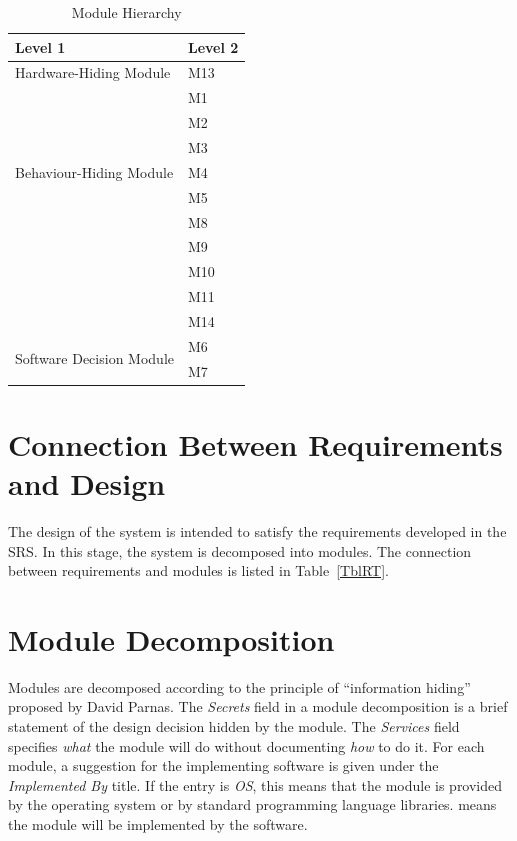 \documentclass[12pt, titlepage]{article}
\begin{document}
\begin{table}[H]
\centering
\begin{tabular}{p{} p{}}
\toprule
\textbf{Level 1} & \textbf{Level 2}\\
\midrule

{Hardware-Hiding Module} & M13 \\
\midrule

\multirow{7}{0.3\textwidth}{Behaviour-Hiding Module}
& M1\\
& M2\\
& M3\\
& M4\\
& M5\\
& M8\\
& M9\\
& M10\\
& M11\\
& M14\\
\midrule

\multirow{2}{0.3\textwidth}{Software Decision Module} & M6 \\  & M7\\
\bottomrule

\end{tabular}
\caption{Module Hierarchy}
\label{TblMH}
\end{table}

\section{Connection Between Requirements and Design} \label{SecConnection}

The design of the system is intended to satisfy the requirements developed in
the SRS. In this stage, the system is decomposed into modules. The connection
between requirements and modules is listed in Table~\ref{TblRT}.

\section{Module Decomposition} \label{SecMD}

Modules are decomposed according to the principle of ``information hiding''
proposed by David Parnas. The \emph{Secrets} field in a module
decomposition is a brief statement of the design decision hidden by the
module. The \emph{Services} field specifies \emph{what} the module will do
without documenting \emph{how} to do it. For each module, a suggestion for the
implementing software is given under the \emph{Implemented By} title. If the
entry is \emph{OS}, this means that the module is provided by the operating
system or by standard programming language libraries.  \emph{\progname{}} means the
module will be implemented by the \progname{} software.
\end{document}
